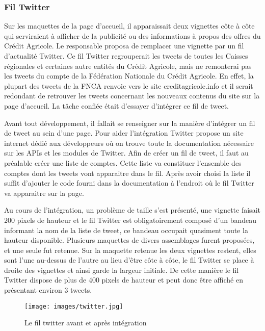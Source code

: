 \documentclass[12pt,a4paper]{article}
\begin{document}
\subsubsection{Fil Twitter}
Sur les maquettes de la page d'accueil, il apparaissait deux vignettes côte à côte qui serviraient à afficher de la publicité ou des informations à propos des offres du Crédit Agricole. Le responsable proposa de remplacer une vignette par un fil d'actualité Twitter. Ce fil Twitter regrouperait les tweets de toutes les Caisses régionales et certaines autre entités du Crédit Agricole, mais ne remonterai pas les tweets du compte de la Fédération Nationale du Crédit Agricole. En effet, la plupart des tweets de la FNCA renvoie vers le site creditagricole.info et il serait redondant de retrouver les tweets concernant les nouveaux contenus du site sur la page d'accueil. La tâche confiée était d'essayer d'intégrer ce fil de tweet.\par
\medskip
Avant tout développement, il fallait se renseigner sur la manière d'intégrer un fil de tweet au sein d'une page. Pour aider l'intégration Twitter propose un site internet dédié aux développeurs où on trouve toute la documentation nécessaire sur les APIs et les modules de Twitter. Afin de créer un fil de tweet, il faut au préalable créer une liste de comptes. Cette liste va constituer l'ensemble des comptes dont les tweets vont apparaitre dans le fil. Après avoir choisi la liste il suffit d'ajouter le code fourni dans la documentation à l'endroit où le fil Twitter va apparaitre sur la page.\par
\medskip
Au cours de l'intégration, un problème de taille s'est présenté, une vignette faisait 200 pixels de hauteur et le fil Twitter est obligatoirement composé d'un bandeau informant la nom de la liste de tweet, ce bandeau occupait quasiment toute la hauteur disponible. Plusieurs maquettes de divers assemblages furent proposées, et une seule fut retenue. Sur la maquette retenue les deux vignettes restent, elles sont l'une au-dessus de l'autre au lieu d'être côte à côte, le fil Twitter se place à droite des vignettes et ainsi garde la largeur initiale. De cette manière le fil Twitter dispose de plus de 400 pixels de hauteur et peut donc être affiché en présentant environ 3 tweets.\par 

\begin{figure}[h!]
\centering\texttt{[image: images/twitter.jpg]} 
\caption{Le fil twitter avant et après intégration}
\end{figure}
\newpage
\end{document}
